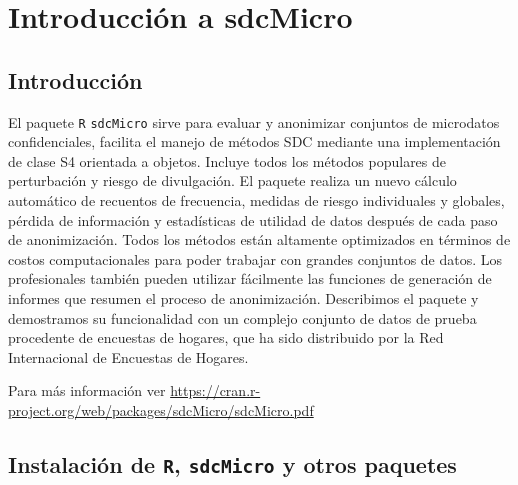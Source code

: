 \documentclass[
]{book}
\theoremstyle{definition}
\theoremstyle{definition}
\theoremstyle{definition}
\theoremstyle{definition}
\theoremstyle{remark}
\begin{document}
\hypertarget{introducciuxf3n-a-sdcmicro}{%
\chapter{Introducción a sdcMicro}\label{introducciuxf3n-a-sdcmicro}}

\hypertarget{introducciuxf3n-1}{%
\section{Introducción}\label{introducciuxf3n-1}}

El paquete \texttt{R} \texttt{sdcMicro} \citet{templ2015} sirve para evaluar y anonimizar conjuntos de microdatos confidenciales, facilita el manejo de métodos SDC mediante una implementación de clase S4 orientada a objetos. Incluye todos los métodos populares de perturbación y riesgo de divulgación. El paquete realiza un nuevo cálculo automático de recuentos de frecuencia, medidas de riesgo individuales y globales, pérdida de información y estadísticas de utilidad de datos después de cada paso de anonimización. Todos los métodos están altamente optimizados en términos de costos computacionales para poder trabajar con grandes conjuntos de datos. Los profesionales también pueden utilizar fácilmente las funciones de generación de informes que resumen el proceso de anonimización. Describimos el paquete y demostramos su funcionalidad con un complejo conjunto de datos de prueba procedente de encuestas de hogares, que ha sido distribuido por la Red Internacional de Encuestas de Hogares.

Para más información ver \url{https://cran.r-project.org/web/packages/sdcMicro/sdcMicro.pdf}

\hypertarget{instalaciuxf3n-de-r-sdcmicro-y-otros-paquetes}{%
\section{\texorpdfstring{Instalación de \texttt{R}, \texttt{sdcMicro} y otros paquetes}{Instalación de R, sdcMicro y otros paquetes}}\label{instalaciuxf3n-de-r-sdcmicro-y-otros-paquetes}}
\end{document}
